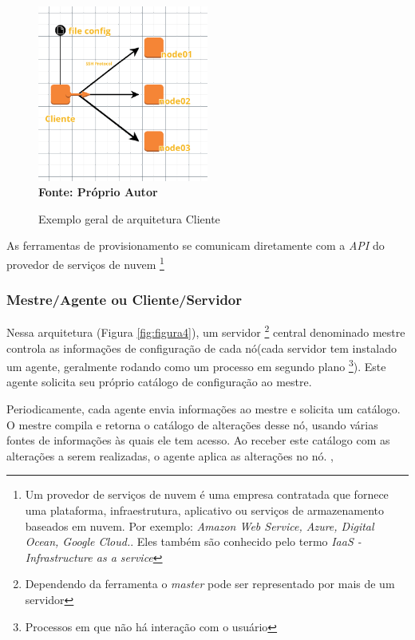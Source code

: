 \begin{figure}[ht]
	\centering	
	\caption[\hspace{0.1cm}Exemplo arquitetura Cliente]{Exemplo geral de arquitetura Cliente}
	\vspace{-0.4cm}
	\includegraphics[width=0.5\textwidth]{figuras/cliente.png}
	 \vspace{-0.2cm}
	\\\textbf{\footnotesize Fonte: Próprio Autor}
	\label{fig:figura3}
\end{figure}
\vspace{-0.5cm}


As ferramentas de provisionamento se comunicam diretamente com a \textit{API} do provedor de serviços de nuvem \footnote{Um provedor de serviços de nuvem é uma empresa contratada que fornece uma plataforma, infraestrutura, aplicativo ou serviços de armazenamento baseados em nuvem. Por exemplo: \textit{Amazon Web Service, Azure, Digital Ocean, Google Cloud.}. Eles também são conhecido pelo termo \textit{IaaS - Infrastructure as a service} }


\subsubsection{Mestre/Agente ou Cliente/Servidor} \label{cliente-servidor}
 
  Nessa arquitetura (Figura \ref{fig:figura4}), um servidor \footnote{Dependendo da ferramenta o \textit{master} pode ser representado por mais de um servidor} central denominado mestre controla as informações de configuração de cada nó(cada servidor tem instalado  um agente, geralmente rodando como um processo em segundo plano \footnote{Processos em que não há interação com o usuário}). Este agente solicita seu próprio catálogo de configuração ao mestre.  
 
 Periodicamente, cada agente envia informações ao mestre e solicita um catálogo. O mestre compila e retorna o catálogo de alterações desse nó, usando várias fontes de informações às quais ele tem acesso. Ao receber este catálogo com as alterações a serem realizadas, o agente aplica as alterações no nó. \cite{puppetlabs}, 
 
